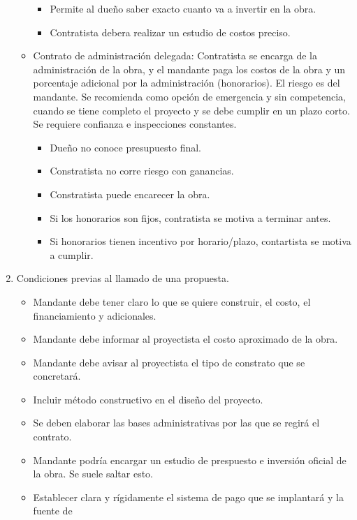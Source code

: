 \documentclass{article} %
\begin{document}
\begin{enumerate}
\begin{itemize}
\begin{itemize}
            \item Permite al dueño saber exacto cuanto va a invertir en la obra.
            \item Contratista debera realizar un estudio de costos preciso.
        \end{itemize}
        \item Contrato de administración delegada: Contratista se encarga de la administración de la obra, y el mandante paga los costos de la obra y un porcentaje adicional por la administración (honorarios). El riesgo es del mandante. Se recomienda como opción de emergencia y sin competencia, cuando se tiene completo el proyecto y se debe cumplir en un plazo corto. Se requiere confianza e inspecciones constantes.
        \begin{itemize}
            \item Dueño no conoce presupuesto final.
            \item Constratista no corre riesgo con ganancias.
            \item Constratista puede encarecer la obra.
            \item Si los honorarios son fijos, contratista se motiva a terminar antes.
            \item Si honorarios tienen incentivo por horario/plazo, contartista se motiva a cumplir.
        \end{itemize}
    \end{itemize}
    \item Condiciones previas al llamado de una propuesta.
    \begin{itemize}
        \item Mandante debe tener claro lo que se quiere construir, el costo, el financiamiento y adicionales.
        \item Mandante debe informar al proyectista el costo aproximado de la obra.
        \item Mandante debe avisar al proyectista el tipo de constrato que se concretará.
        \item Incluir método constructivo en el diseño del proyecto.
        \item Se deben elaborar las bases administrativas por las que se regirá el contrato.
        \item Mandante podría encargar un estudio de prespuesto e inversión oficial de la obra. Se suele saltar esto.
        \item Establecer clara y rígidamente el sistema de pago que se implantará y la fuente de

\end{itemize}
\end{enumerate}
\end{document}
